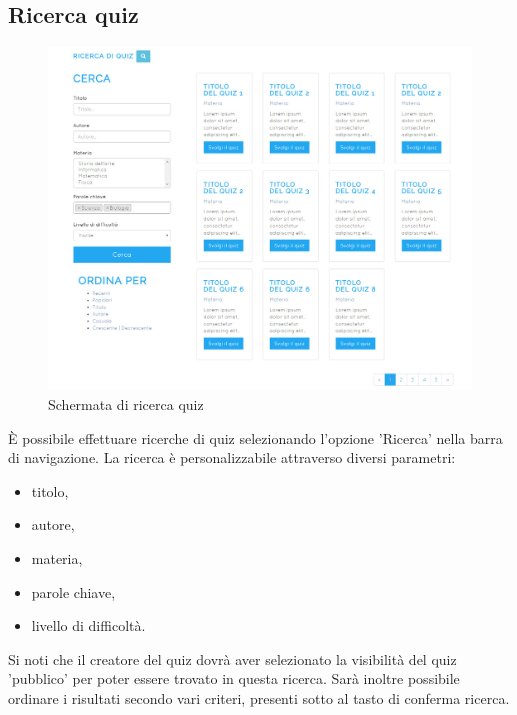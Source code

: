 \documentclass[a4paper, titlepage]{article}
\begin{document}
	\subsection{Ricerca quiz}
	\begin{figure}[!h]
		\centering
		\includegraphics[scale=0.33]{Img/screen_RicercaQuiz.png}
		\caption{Schermata di ricerca quiz}
	\end{figure}
	 È possibile effettuare ricerche di quiz selezionando l'opzione 'Ricerca' nella barra di navigazione. La ricerca è personalizzabile attraverso diversi parametri:
	 \begin{itemize}
	 	\item titolo,
	 	\item autore,
	 	\item materia,
	 	\item parole chiave,
	 	\item livello di difficoltà.
	 \end{itemize}
	 Si noti che il creatore del quiz dovrà aver selezionato la visibilità del quiz 'pubblico' per poter essere trovato in questa ricerca. Sarà inoltre possibile ordinare i risultati secondo vari criteri, presenti sotto al tasto di conferma ricerca.
	 
	 \newpage
\end{document}
